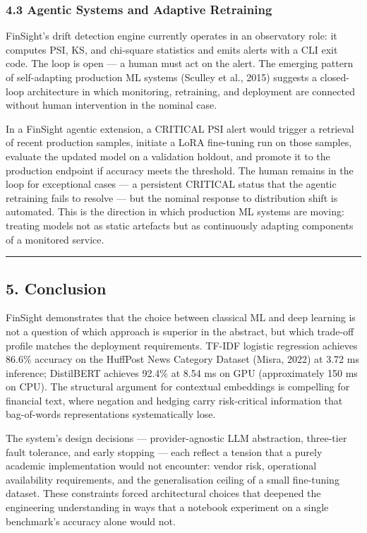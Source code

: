 \documentclass[11pt,a4paper]{article}
\begin{document}
\subsubsection*{4.3 Agentic Systems and Adaptive Retraining}

FinSight's drift detection engine currently operates in an observatory role: it computes PSI, KS, and chi-square statistics and emits alerts with a CLI exit code. The loop is open — a human must act on the alert. The emerging pattern of self-adapting production ML systems (Sculley et al., 2015) suggests a closed-loop architecture in which monitoring, retraining, and deployment are connected without human intervention in the nominal case.

In a FinSight agentic extension, a CRITICAL PSI alert would trigger a retrieval of recent production samples, initiate a LoRA fine-tuning run on those samples, evaluate the updated model on a validation holdout, and promote it to the production endpoint if accuracy meets the threshold. The human remains in the loop for exceptional cases — a persistent CRITICAL status that the agentic retraining fails to resolve — but the nominal response to distribution shift is automated. This is the direction in which production ML systems are moving: treating models not as static artefacts but as continuously adapting components of a monitored service.

\noindent\rule{\linewidth}{0.4pt}

\subsection*{5. Conclusion}

FinSight demonstrates that the choice between classical ML and deep learning is not a question of which approach is superior in the abstract, but which trade-off profile matches the deployment requirements. TF-IDF logistic regression achieves 86.6\% accuracy on the HuffPost News Category Dataset (Misra, 2022) at 3.72 ms inference; DistilBERT achieves 92.4\% at 8.54 ms on GPU (approximately 150 ms on CPU). The structural argument for contextual embeddings is compelling for financial text, where negation and hedging carry risk-critical information that bag-of-words representations systematically lose.

The system's design decisions — provider-agnostic LLM abstraction, three-tier fault tolerance, and early stopping — each reflect a tension that a purely academic implementation would not encounter: vendor risk, operational availability requirements, and the generalisation ceiling of a small fine-tuning dataset. These constraints forced architectural choices that deepened the engineering understanding in ways that a notebook experiment on a single benchmark's accuracy alone would not.
\end{document}
